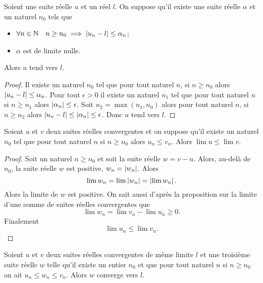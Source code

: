 \begin{prop}
  Soient une suite réelle $u$ et un réel $l$. On suppose qu'il existe une suite réelle $\alpha$ et un naturel $n_0$ tels que
  \begin{itemize}
  \item $\forall n \in \mathbb{N} \quad n \geq n_0 \implies \left\lvert u_n-l\right\rvert \leq \alpha_n$;
  \item $\alpha$ est de limite nulle.
  \end{itemize}
  Alors $u$ tend vers $l$.
\end{prop}
\begin{proof}
  Il existe un naturel $n_0$ tel que pour tout naturel $n$, si $n \geq n_0$ alors $\left\lvert u_n-l\right\rvert \leq \alpha_n$. Pour tout $\epsilon>0$ il existe un naturel $n_1$ tel que pour tout naturel $n$ si $n\geq n_1$ alors $\left\lvert\alpha_n\right\rvert \leq \epsilon$. Soit $n_2=\max(n_1,n_0)$ alors pour tout naturel $n$, si $n \geq n_2$ alors $\left\lvert u_n-l\right\rvert\leq \left\lvert\alpha_n\right\rvert\leq \epsilon$. Donc $u$ tend vers $l$.
\end{proof}
\begin{prop}
  Soient $u$ et $v$ deux suites réelles convergentes et on suppose qu'il existe un naturel $n_0$ tel que pour tout naturel $n$ si $n \geq n_0$ alors $u_n \leq v_n$. Alors $\lim u \leq \lim v$.
\end{prop}
\begin{proof}
  Soit un naturel $n \geq n_0$ et soit la suite réelle $w=v-u$. Alors, au-delà de $n_0$, la suite réelle $w$ est positive, $w_n=\left\lvert w_n\right\rvert$. Alors
  \begin{equation}
    \lim w_n=\lim \left\lvert w_n\right\rvert=\left\lvert\lim w_n\right\rvert.
  \end{equation}
Alors la limite de $w$ est positive. On sait aussi d'après la proposition sur la limite d'une somme de suites réelles convergentes que
\begin{equation}
  \lim w_n = \lim v_n - \lim u_n \geq 0.
\end{equation}
Finalement
\begin{equation}
  \lim u_n \leq \lim v_n.
\end{equation}
\end{proof}
\begin{theo}
  Soient $u$ et $v$ deux suites réelles convergentes de même limite $l$ et une troisième suite réelle $w$ telle qu'il existe un entier $n_0$ et que pour tout naturel $n$ si $n \geq n_0$ on ait $u_n \leq w_n \leq v_n$. Alors $w$ converge vers $l$.
\end{theo}
